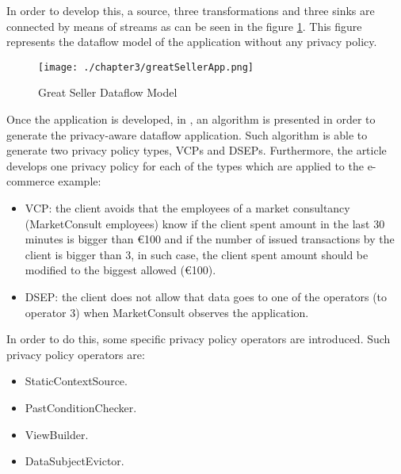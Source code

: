 In order to develop this, a source, three transformations and three sinks are connected by means of streams as can be seen in the figure \ref{fig:Great Seller Dataflow Model}. This figure represents the dataflow model of the application without any privacy policy.

\begin{figure}
\centering
{\texttt{[image: ./chapter3/greatSellerApp.png]}}
\caption{Great Seller Dataflow Model}
\label{fig:Great Seller Dataflow Model}
\end{figure}

Once the application is developed, in \cite{privacypoliciesarticle}, an algorithm is presented in order to generate the privacy-aware dataflow application. Such algorithm is able to generate two privacy policy types, VCPs and DSEPs. Furthermore, the article develops one privacy policy for each of the types which are applied to the e-commerce example:

\begin{itemize}
\item VCP: the client avoids that the employees of a market consultancy (MarketConsult employees) know if the client spent amount in the last 30 minutes is bigger than \euro{100} and if the number of issued transactions by the client is bigger than 3, in such case, the client spent amount should be modified to the biggest allowed (\euro{100}).
\item DSEP: the client does not allow that data goes to one of the operators (to operator 3) when MarketConsult observes the application.
\end{itemize}

In order to do this, some specific privacy policy operators are introduced. Such privacy policy operators are:

\begin{itemize}
\item StaticContextSource.
\item PastConditionChecker.
\item ViewBuilder.
\item DataSubjectEvictor.
\end{itemize}

